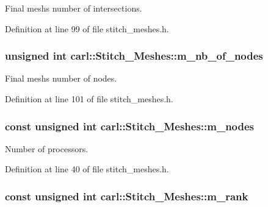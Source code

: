Final mesh\textquotesingle{}s number of intersections. 



Definition at line 99 of file stitch\+\_\+meshes.\+h.

\hypertarget{classcarl_1_1_stitch___meshes_adfdcce2888197b90c9e56449d1a75b6b}{}
\subsubsection[{m\+\_\+nb\+\_\+of\+\_\+nodes}]{\setlength{\rightskip}{0pt plus 5cm}unsigned int carl\+::\+Stitch\+\_\+\+Meshes\+::m\+\_\+nb\+\_\+of\+\_\+nodes\hspace{0.3cm}{\ttfamily [protected]}}\label{classcarl_1_1_stitch___meshes_adfdcce2888197b90c9e56449d1a75b6b}


Final mesh\textquotesingle{}s number of nodes. 



Definition at line 101 of file stitch\+\_\+meshes.\+h.

\hypertarget{classcarl_1_1_stitch___meshes_a9e20d5781074c285506605f0af1d024b}{}
\subsubsection[{m\+\_\+nodes}]{\setlength{\rightskip}{0pt plus 5cm}const unsigned int carl\+::\+Stitch\+\_\+\+Meshes\+::m\+\_\+nodes\hspace{0.3cm}{\ttfamily [protected]}}\label{classcarl_1_1_stitch___meshes_a9e20d5781074c285506605f0af1d024b}


Number of processors. 



Definition at line 40 of file stitch\+\_\+meshes.\+h.

\hypertarget{classcarl_1_1_stitch___meshes_a50b57beb1d6c0688641a52a9156b8dd2}{}
\subsubsection[{m\+\_\+rank}]{\setlength{\rightskip}{0pt plus 5cm}const unsigned int carl\+::\+Stitch\+\_\+\+Meshes\+::m\+\_\+rank\hspace{0.3cm}{\ttfamily [protected]}}\label{classcarl_1_1_stitch___meshes_a50b57beb1d6c0688641a52a9156b8dd2}


